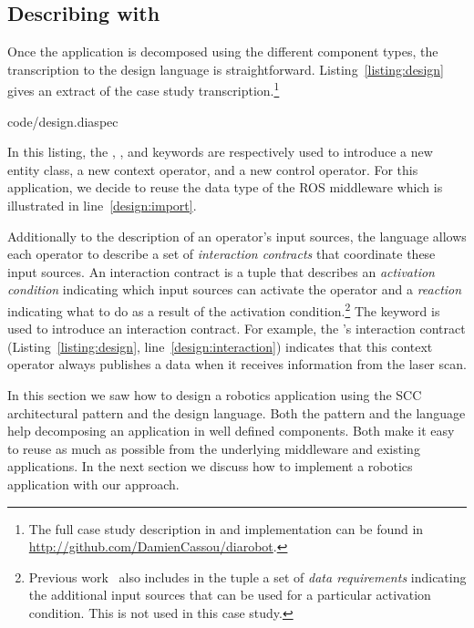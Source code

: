 \subsection{Describing with \diaspec{}}

Once the application is decomposed using the different component
types, the transcription to the \diaspec{} design language is
straightforward. Listing~\ref{listing:design} gives an extract of the
case study transcription.\footnote{The full case study description in
  \diaspec{} and implementation can be found in
  \url{http://github.com/DamienCassou/diarobot}.}

%
{code/design.diaspec}

In this listing, the , , and 
keywords are respectively used to introduce a new entity class, a new
context operator, and a new control operator. For this application, we
decide to reuse the  data type of the ROS middleware which
is illustrated in line~\ref{design:import}.

Additionally to the description of an operator's input sources, the
\diaspec{} language allows each operator to describe a set of
\emph{interaction contracts} that coordinate these input sources. An
interaction contract is a tuple that describes an \emph{activation
  condition} indicating which input sources can activate the operator
and a \emph{reaction} indicating what to do as a result of the
activation condition.\footnote{Previous work~\cite{Cass11a} also
  includes in the tuple a set of \emph{data requirements} indicating
  the additional input sources that can be used for a particular
  activation condition. This is not used in this case study.} The
 keyword is used to introduce an interaction contract.
For example, the 's interaction contract
(Listing~\ref{listing:design}, line~\ref{design:interaction})
indicates that this context operator always publishes a data when it
receives information from the laser scan.

In this section we saw how to design a robotics application using
the SCC architectural pattern and the \diaspec{} design language. Both
the pattern and the language help decomposing an application in well
defined components. Both make it easy to reuse as much as possible
from the underlying middleware and existing applications. In the next
section we discuss how to implement a robotics application with our
approach.


